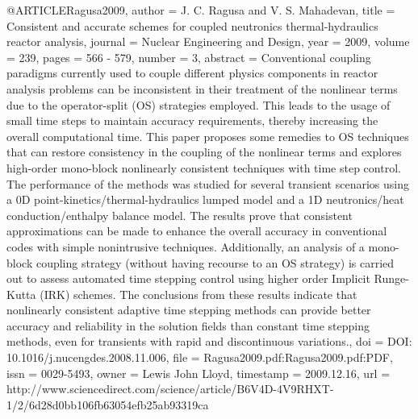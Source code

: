 {{@ARTICLE{Ragusa2009,
  author = {J. C. Ragusa and V. S. Mahadevan},
  title = {Consistent and accurate schemes for coupled neutronics thermal-hydraulics
	reactor analysis},
  journal = {Nuclear Engineering and Design},
  year = {2009},
  volume = {239},
  pages = {566 - 579},
  number = {3},
  abstract = {Conventional coupling paradigms currently used to couple different
	physics components in reactor analysis problems can be inconsistent
	in their treatment of the nonlinear terms due to the operator-split
	(OS) strategies employed. This leads to the usage of small time steps
	to maintain accuracy requirements, thereby increasing the overall
	computational time. This paper proposes some remedies to OS techniques
	that can restore consistency in the coupling of the nonlinear terms
	and explores high-order mono-block nonlinearly consistent techniques
	with time step control. The performance of the methods was studied
	for several transient scenarios using a 0D point-kinetics/thermal-hydraulics
	lumped model and a 1D neutronics/heat conduction/enthalpy balance
	model. The results prove that consistent approximations can be made
	to enhance the overall accuracy in conventional codes with simple
	nonintrusive techniques. Additionally, an analysis of a mono-block
	coupling strategy (without having recourse to an OS strategy) is
	carried out to assess automated time stepping control using higher
	order Implicit Runge-Kutta (IRK) schemes. The conclusions from these
	results indicate that nonlinearly consistent adaptive time stepping
	methods can provide better accuracy and reliability in the solution
	fields than constant time stepping methods, even for transients with
	rapid and discontinuous variations.},
  doi = {DOI: 10.1016/j.nucengdes.2008.11.006},
  file = {Ragusa2009.pdf:Ragusa2009.pdf:PDF},
  issn = {0029-5493},
  owner = {Lewis John Lloyd},
  timestamp = {2009.12.16},
  url = {http://www.sciencedirect.com/science/article/B6V4D-4V9RHXT-1/2/6d28d0bb106fb63054efb25ab93319ca}
}

}}
